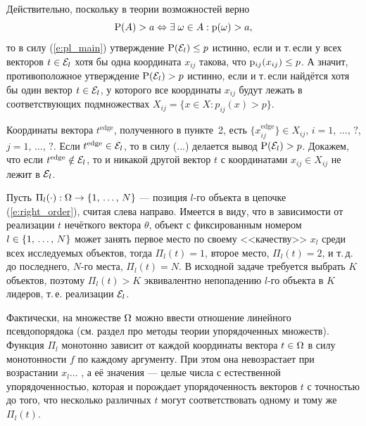 Действительно, поскольку в теории возможностей верно
\begin{equation*}
  {\mathrm{P}}(A) > a \Leftrightarrow \exists\;\omega \in A: {\mathrm{p}}(\omega) > a,
\end{equation*}
то в силу (\ref{e:pl_main}) утверждение ${\mathrm{P}}(\mathcal{E}_l) \leq p$ истинно, если и т.\,если у всех векторов $t \in \mathcal{E}_l$ хотя бы одна координата $x_{ij}$ такова, что ${\mathrm{p}}_{ij}(x_{ij}) \leq p$. А значит, противоположное утверждение ${\mathrm{P}}(\mathcal{E}_l) > p$ истинно, если и т.\,если найдётся хотя бы один вектор $t \in \mathcal{E}_l$, у которого все координаты $x_{ij} $ будут лежать в соответствующих подмножествах $X_{ij} = \{x \in X: p_{ij}(x) > p\}$. 

Координаты вектора $t^\text{edge}$, полученного в пункте~2, есть $\{x_{ij}^\text{edge}\} \in X_{ij}$, $i=1,\, \ldots,\, ?$, $j=1,\, \ldots,\, ?$.
Если $t^\text{edge} \in \mathcal{E}_l$, то в силу (...) делается вывод ${\mathrm{P}}(\mathcal{E}_l) > p$. Докажем, что если $t^\text{edge} \notin \mathcal{E}_l$, то и никакой другой вектор $t$ с координатами $x_{ij} \in X_{ij}$ не лежит в $\mathcal{E}_l$. 

Пусть $\Pi_l(\cdot): \Omega \rightarrow \{1,\, \ldots,\, N\}$ --- позиция $l$-го объекта в цепочке (\ref{e:right_order}), считая слева направо. Имеется в виду, что в зависимости от реализации $t$ нечёткого вектора $\theta$, объект с фиксированным номером $l \in \{1,\, \ldots,\, N\}$ может занять первое место по своему <<качеству>> $x_l$ среди всех исследуемых объектов, тогда $\Pi_l(t) = 1$, второе место, $\Pi_l(t) = 2$, и т.\,д. до последнего, $N$-го места, $\Pi_l(t) = N$. В исходной задаче требуется выбрать $K$ объектов, поэтому  $\Pi_l(t) > K$ эквивалентно непопадению $l$-го объекта в $K$ лидеров, т.\,е. реализации $\mathcal{E}_l$. 

Фактически, на множестве $\Omega$ можно ввести отношение линейного псевдопорядока  (см. раздел про методы теории упорядоченных множеств). Функция $\Pi_l$ монотонно зависит от каждой координаты вектора $t \in \Omega$ в силу монотонности $f$ по каждому аргументу. При этом она невозрастает при возрастании $x_l$... , а её значения --- целые числа с естественной упорядоченностью, которая и порождает упорядоченность векторов $t$ с точностью до того, что несколько различных $t$ могут соответствовать одному и тому же $\Pi_l(t)$. 

